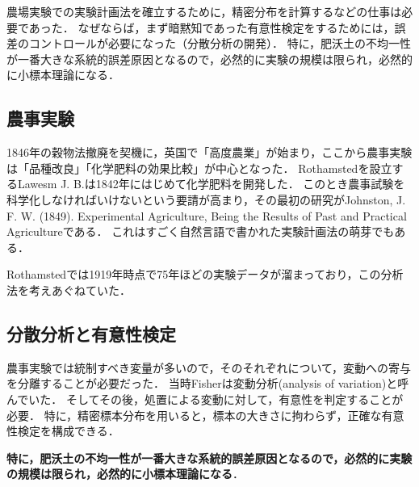 \documentclass[uplatex,dvipdfmx]{jsreport}
\begin{document}
\begin{tcolorbox}[colframe=ForestGreen, colback=ForestGreen!10!white,breakable,colbacktitle=ForestGreen!40!white,coltitle=black,fonttitle=\bfseries\sffamily,
title=]
    農場実験での実験計画法を確立するために，精密分布を計算するなどの仕事は必要であった．
    なぜならば，まず暗黙知であった有意性検定をするためには，誤差のコントロールが必要になった（分散分析の開発）．
    特に，肥沃土の不均一性が一番大きな系統的誤差原因となるので，必然的に実験の規模は限られ，必然的に小標本理論になる．
\end{tcolorbox}

\subsection{農事実験}

\begin{history}[高度農業]
    1846年の穀物法撤廃を契機に，英国で「高度農業」が始まり，ここから農事実験は「品種改良」「化学肥料の効果比較」が中心となった．
    Rothamstedを設立するLawesm J. B.は1842年にはじめて化学肥料を開発した．
    このとき農事試験を科学化しなければいけないという要請が高まり，その最初の研究がJohnston, J. F. W. (1849). Experimental Agriculture, Being the Results of Past and Practical Agricultureである．
    これはすごく自然言語で書かれた実験計画法の萌芽でもある．
\end{history}

\begin{history}
    Rothamstedでは1919年時点で75年ほどの実験データが溜まっており，この分析法を考えあぐねていた．
\end{history}

\subsection{分散分析と有意性検定}

\begin{tcolorbox}[colframe=ForestGreen, colback=ForestGreen!10!white,breakable,colbacktitle=ForestGreen!40!white,coltitle=black,fonttitle=\bfseries\sffamily,
title=]
    農事実験では統制すべき変量が多いので，そのそれぞれについて，変動への寄与を分離することが必要だった．
    当時Fisherは変動分析(analysis of variation)と呼んでいた．
    そしてその後，処置による変動に対して，有意性を判定することが必要．
    特に，精密標本分布を用いると，標本の大きさに拘わらず，正確な有意性検定を構成できる．

    \textbf{特に，肥沃土の不均一性が一番大きな系統的誤差原因となるので，必然的に実験の規模は限られ，必然的に小標本理論になる}．
\end{tcolorbox}
\end{document}
